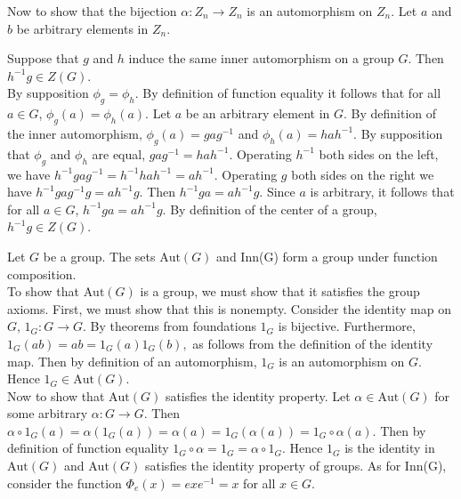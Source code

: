 \documentclass{article}
\newcommand{\Aut}{\mbox{Aut}}
\begin{document}
Now to show that the bijection $\alpha: Z_n\rightarrow Z_n$ is an automorphism on $Z_n$. Let $a$ and $b$ be arbitrary elements in $Z_n$. 

 Suppose that $g$ and $h$ induce the same inner automorphism on a group $G$. Then $h^{-1}g\in Z(G)$.\\

 By supposition $\phi_g = \phi_h$. By definition of function equality it follows that for all $a\in G$, $\phi_g(a) = \phi_h(a)$. Let $a$ be an arbitrary element in $G$. By definition of the inner automorphism, $\phi_g(a) = gag^{-1}$ and $\phi_h(a) = hah^{-1}.$ By supposition that $\phi_g$ and $\phi_h$ are equal, $gag^{-1} = hah^{-1}.$ Operating $h^{-1}$ both sides on the left, we have $h^{-1}gag^{-1} = h^{-1}hah^{-1} = ah^{-1}.$ Operating $g$ both sides on the right we have  $h^{-1}gag^{-1}g = ah^{-1}g$. Then $h^{-1}ga = ah^{-1}g$. Since $a$ is arbitrary, it follows that for all $a\in G$, $h^{-1}g a = a h^{-1}g$. By definition of the center of a group, $h^{-1}g \in Z(G)$. \\
\newpage

 Let $G$ be a group. The sets $\Aut(G)$ and Inn(G) form a group under function composition.\\

 To show that $\Aut(G)$ is a group, we must show that it satisfies the group axioms. First, we must show that this is nonempty. Consider the identity map on $G$, $1_G:G\rightarrow G$. By theorems from foundations $1_G$ is bijective. Furthermore, $1_G(ab) = ab = 1_G(a) 1_G(b),$ as follows from the definition of the identity map. Then by definition of an automorphism, $1_G$ is an automorphism on $G$. Hence $1_G\in \Aut(G)$. \\

Now to show that $\Aut(G)$ satisfies the identity property. Let $\alpha \in \Aut(G)$ for some arbitrary $\alpha:G\rightarrow G$. Then $\alpha\circ 1_G(a) = \alpha(1_G(a)) = \alpha(a) = 1_G(\alpha(a)) = 1_G\circ \alpha(a).$ Then by definition of function equality $1_G\circ \alpha = 1_G = \alpha\circ 1_G$. Hence $1_G$ is the identity in $\Aut(G)$ and $\Aut(G)$ satisfies the identity property of groups. As for Inn(G), consider the function $\Phi_e(x)=exe^{-1}=x$ for all $x\in G$. \\
\end{document}
